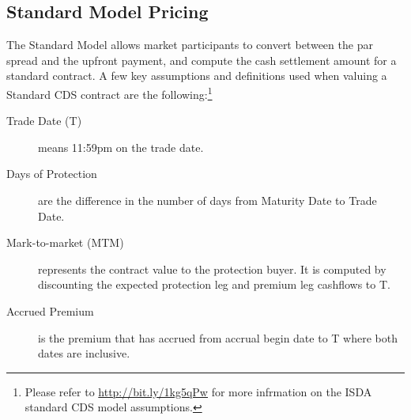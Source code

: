 \documentclass[a4paper]{article}
\begin{document}
\subsection{Standard Model Pricing}
\label{sec:pricing}
The Standard Model allows market participants to convert between
the par spread and the upfront payment, and compute the cash
settlement amount for a standard contract. A few key assumptions and
definitions used when valuing a Standard CDS contract are the
following:\footnote{Please refer to \url{http://bit.ly/1kg5qPw} for
  more infrmation on the ISDA standard CDS model assumptions.}


\begin{description}
\item [Trade Date (T)] means 11:59pm on the trade date.
\item [Days of Protection] are the difference in the number of days
  from Maturity Date to Trade Date.
\item [Mark-to-market (MTM)] represents the contract value to the
  protection buyer. It is computed by discounting the expected
  protection leg and premium leg cashflows to T.
\item [Accrued Premium] is the premium that has accrued from accrual
  begin date to T where both dates are inclusive.
\end{description}

\end{document}
